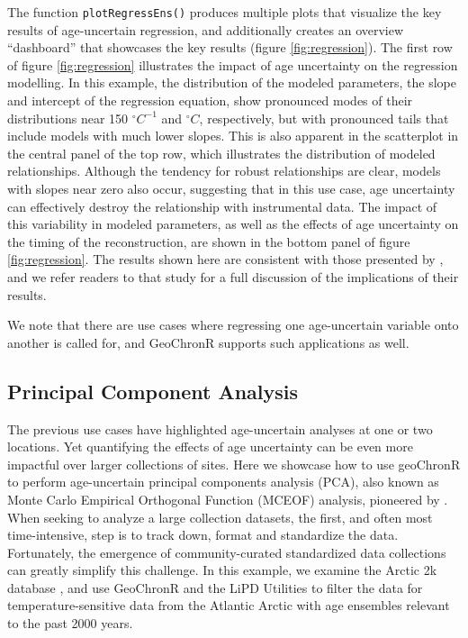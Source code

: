 \documentclass[gchron, manuscript]{copernicus}
\begin{document}
The function \texttt{plotRegressEns()} produces multiple plots that visualize the key results of age-uncertain regression, and additionally creates an overview ``dashboard'' that showcases the key results (figure \ref{fig:regression}).
The first row of figure \ref{fig:regression} illustrates the impact of age uncertainty on the regression modelling.
In this example, the distribution of the modeled parameters, the slope and intercept of the regression equation, show pronounced modes of their distributions near 150 \(^\circ C^{-1}\) and \(^\circ C\), respectively, but with pronounced tails that include models with much lower slopes.
This is also apparent in the scatterplot in the central panel of the top row, which illustrates the distribution of modeled relationships.
Although the tendency for robust relationships are clear, models with slopes near zero also occur, suggesting that in this use case, age uncertainty can effectively destroy the relationship with instrumental data.
The impact of this variability in modeled parameters, as well as the effects of age uncertainty on the timing of the reconstruction, are shown in the bottom panel of figure \ref{fig:regression}.
The results shown here are consistent with those presented by \citet{Boldt2015}, and we refer readers to that study for a full discussion of the implications of their results.

We note that there are use cases where regressing one age-uncertain variable onto another is called for, and GeoChronR supports such applications as well.

\hypertarget{sec:pca}{%
\subsection{Principal Component Analysis}\label{sec:pca}}

The previous use cases have highlighted age-uncertain analyses at one or two locations. Yet quantifying the effects of age uncertainty can be even more impactful over larger collections of sites.
Here we showcase how to use geoChronR to perform age-uncertain principal components analysis (PCA), also known as Monte Carlo Empirical Orthogonal Function (MCEOF) analysis, pioneered by \citet{anchukaitis2013mceof}.
When seeking to analyze a large collection datasets, the first, and often most time-intensive, step is to track down, format and standardize the data.
Fortunately, the emergence of community-curated standardized data collections \citetext{\citealp[e.g.][]{PAGES2K_ngeo2013_short}; \citealp{pages2k2017}; \citealp[ ]{kaufman2020temp12k}; \citealp{konecky2020iso2k}} can greatly simplify this challenge.
In this example, we examine the Arctic 2k database \citep{McKayKaufman2014}, and use GeoChronR and the LiPD Utilities to filter the data for temperature-sensitive data from the Atlantic Arctic with age ensembles relevant to the past 2000 years.
\end{document}
